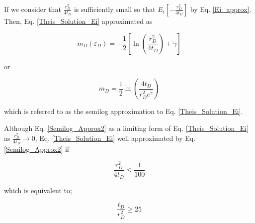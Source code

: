 \documentclass{llncs}
\numberwithin{equation}{section}
\numberwithin{figure}{section}
\numberwithin{table}{section}
\begin{document}
    If we consider that $\frac{r_{D}^{2}}{4{{t}_{D}}}$ is sufficiently small so that  ${{E}_{i}}\left[ -\frac{r_{D}^{2}}{4{{t}_{D}}} \right]$  by Eq. \ref{Ei_approx}. Then, Eq. \ref{Theis_Solution_Ei}  approximated as

    \begin{equation}
        {{ m }_{D}}\left( {{\varepsilon }_{D}} \right)=-\frac{1}{2}\left[ \ln \left( \frac{r_{D}^{2}}{4{{t}_{D}}} \right)+\widetilde{\gamma } \right]
        \label{Semilog_Approx1}
    \end{equation}

    or

    \begin{equation}
        {{ m }_{D}}=\frac{1}{2}\ln \left( \frac{4{{t}_{D}}}{r_{D}^{2}{{e}^{\widetilde{\gamma }}}} \right)
        \label{Semilog_Approx2}
    \end{equation}

    which is referred to as the semilog approximation to Eq. \ref{Theis_Solution_Ei}.

    Although Eq. \ref{Semilog_Approx2}  as a limiting form of Eq. \ref{Theis_Solution_Ei} as $\frac{r_{D}^{2}}{4{{t}_{D}}}\to 0$, Eq. \ref{Theis_Solution_Ei}  well approximated by Eq. \ref{Semilog_Approx2} if

    \begin{equation*}
        \frac{r_{D}^{2}}{4{{t}_{D}}}\le \frac{1}{100}
    \end{equation*}

    which is equivalent to;

    \begin{equation}
        \frac{{{t}_{D}}}{r_{D}^{2}}\ge 25
        \label{Semilog_Approx2_}
    \end{equation}
\end{document}
